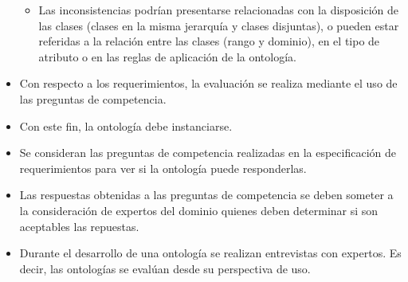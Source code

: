 \documentclass[a4paper,10pt,spanish,oneside]{article}
\begin{document}
\begin{itemize}
\begin{itemize}
\item Las inconsistencias podrían presentarse relacionadas con la disposición de las clases (clases en la misma jerarquía y clases disjuntas), o pueden estar referidas a la relación entre las clases (rango y dominio), en el tipo de atributo o en las reglas de aplicación de la ontología.
\end{itemize}

\item Con respecto a los requerimientos, la evaluación se realiza mediante el uso de las preguntas de competencia.

\item Con este fin, la ontología debe instanciarse.

\item Se consideran las preguntas de competencia realizadas en la especificación de requerimientos para ver si la ontología puede responderlas.

\item Las respuestas obtenidas a las preguntas de competencia se deben someter a la consideración de expertos del dominio quienes deben determinar si son aceptables las repuestas.

\item Durante el desarrollo de una ontología se realizan entrevistas con expertos. Es decir, las ontologías se evalúan desde su perspectiva de uso.

\end{itemize}
\end{document}
